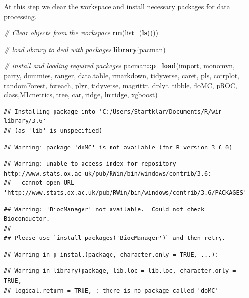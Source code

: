 \documentclass[]{article}
\newenvironment{Shaded}{\begin{snugshade}}{\end{snugshade}}
\newcommand{\CommentTok}[1]{\textcolor[rgb]{0.56,0.35,0.01}{\textit{#1}}}
\newcommand{\DataTypeTok}[1]{\textcolor[rgb]{0.13,0.29,0.53}{#1}}
\newcommand{\KeywordTok}[1]{\textcolor[rgb]{0.13,0.29,0.53}{\textbf{#1}}}
\newcommand{\NormalTok}[1]{#1}
\newcommand{\OperatorTok}[1]{\textcolor[rgb]{0.81,0.36,0.00}{\textbf{#1}}}
\begin{document}
At this step we clear the workspace and install necessary packages for
data processing.

\begin{Shaded}
\begin{Highlighting}[]
  \CommentTok{# Clear objects from the workspace}
  \KeywordTok{rm}\NormalTok{(}\DataTypeTok{list=}\NormalTok{(}\KeywordTok{ls}\NormalTok{()))}
  
  \CommentTok{# load library to deal with packages}
  \KeywordTok{library}\NormalTok{(pacman)}

  \CommentTok{# install and loading required packages}
\NormalTok{  pacman}\OperatorTok{::}\KeywordTok{p_load}\NormalTok{(import, monomvn, party, dummies, ranger, data.table, rmarkdown, tidyverse, }
\NormalTok{  caret, pls, corrplot, randomForest, foreach, plyr, tidyverse, magrittr, dplyr, tibble, doMC, }
\NormalTok{  pROC, class,MLmetrics, tree, car, ridge, lmridge, xgboost)}
\end{Highlighting}
\end{Shaded}

\begin{verbatim}
## Installing package into 'C:/Users/Startklar/Documents/R/win-library/3.6'
## (as 'lib' is unspecified)
\end{verbatim}

\begin{verbatim}
## Warning: package 'doMC' is not available (for R version 3.6.0)
\end{verbatim}

\begin{verbatim}
## Warning: unable to access index for repository http://www.stats.ox.ac.uk/pub/RWin/bin/windows/contrib/3.6:
##   cannot open URL 'http://www.stats.ox.ac.uk/pub/RWin/bin/windows/contrib/3.6/PACKAGES'
\end{verbatim}

\begin{verbatim}
## Warning: 'BiocManager' not available.  Could not check Bioconductor.
## 
## Please use `install.packages('BiocManager')` and then retry.
\end{verbatim}

\begin{verbatim}
## Warning in p_install(package, character.only = TRUE, ...):
\end{verbatim}

\begin{verbatim}
## Warning in library(package, lib.loc = lib.loc, character.only = TRUE,
## logical.return = TRUE, : there is no package called 'doMC'
\end{verbatim}
\end{document}
